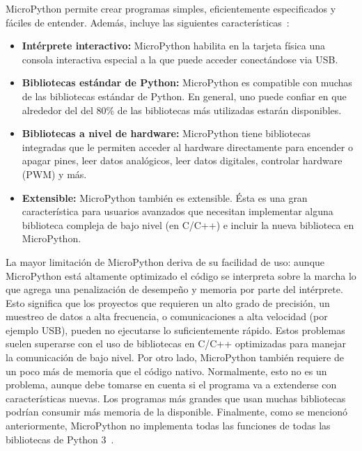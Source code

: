 MicroPython permite crear programas simples, eficientemente especificados y fáciles de entender.
Además, incluye las siguientes características~:

\begin{itemize}[nosep]
	\item \textbf{Intérprete interactivo:} MicroPython habilita en la tarjeta física una consola interactiva especial a la que puede acceder conectándose via USB. %

	\item \textbf{Bibliotecas estándar de Python:} MicroPython es compatible con muchas de las bibliotecas estándar de Python.
	En general, uno puede confiar en que alrededor del del 80\% de las bibliotecas más utilizadas estarán disponibles.

	\item \textbf{Bibliotecas a nivel de hardware:} MicroPython tiene bibliotecas integradas que le permiten acceder al hardware directamente para encender o apagar pines, leer datos analógicos, leer datos digitales, controlar hardware (PWM) y más.

	\item \textbf{Extensible:} MicroPython también es extensible.
	Ésta es una gran característica para usuarios avanzados que necesitan implementar alguna biblioteca compleja de bajo nivel (en C/C++) e incluir la nueva biblioteca en MicroPython.
\end{itemize}

La mayor limitación de MicroPython  deriva de su facilidad de uso:
aunque MicroPython está altamente optimizado el código se interpreta sobre la marcha lo que agrega una penalización de desempeño y memoria por parte del intérprete.
Esto significa que los proyectos que requieren un alto grado de precisión, un muestreo de datos a alta frecuencia, o comunicaciones a alta velocidad (por ejemplo USB), pueden no ejecutarse lo suficientemente rápido.
Estos problemas suelen superarse con el uso de bibliotecas en C/C++ optimizadas para manejar la comunicación de bajo nivel.
Por otro lado, MicroPython también requiere de un poco más de memoria que el código nativo.
Normalmente, esto no es un problema, aunque debe tomarse en cuenta si el programa va a extenderse con características nuevas.
Los programas más grandes que usan muchas bibliotecas podrían consumir más memoria de la disponible.
Finalmente, como se mencionó anteriormente, MicroPython no implementa todas las funciones de todas las bibliotecas de Python 3~.




